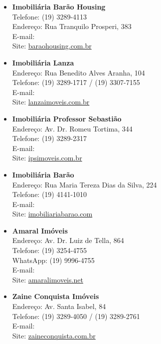 \begin{itemize}
    \item   \textbf{Imobiliária Barão Housing}
        \\Telefone: (19) 3289-4113
        \\Endereço: Rua Tranquilo Prosperi, 383
        \\E-mail: 
        \\Site: \url{baraohousing.com.br}

    \item   \textbf{Imobiliária Lanza}
        \\Endereço: Rua Benedito Alves Aranha, 104
        \\Telefone: (19) 3289-1717 / (19) 3307-7155
        \\E-mail: 
        \\Site: \url{lanzaimoveis.com.br}

    \item   \textbf{Imobiliária Professor Sebastião}
        \\Endereço: Av. Dr. Romeu Tortima, 344
        \\Telefone: (19) 3289-2317
        \\E-mail: 
        \\Site: \url{ipsimoveis.com.br}

    \item   \textbf{Imobiliária Barão}
        \\Endereço: Rua Maria Tereza Dias da Silva, 224
        \\Telefone: (19) 4141-1010
        \\E-mail: 
        \\Site: \url{imobiliariabarao.com}

    \item   \textbf{Amaral Imóveis}
        \\Endereço: Av. Dr. Luiz de Tella, 864
        \\Telefone: (19) 3254-4755
        \\WhatsApp: (19) 9996-4755
        \\E-mail: 
        \\Site: \url{amaralimoveis.net}

    \item   \textbf{Zaine Conquista Imóveis}
        \\Endereço: Av. Santa Isabel, 84
        \\Telefone: (19) 3289-4050 / (19) 3289-2761
        \\E-mail: 
        \\Site: \url{zaineconquista.com.br}


\end{itemize}

